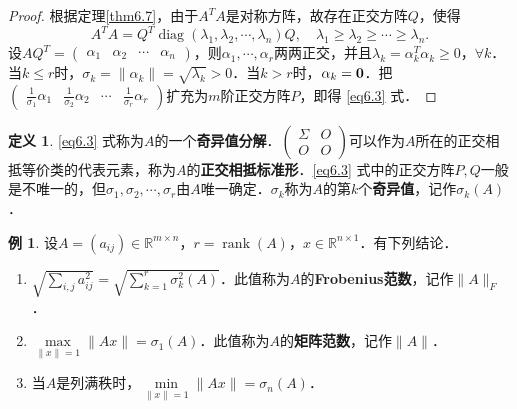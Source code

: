\documentclass[a4paper,fontset=windows]{ctexbook}
\theoremstyle{definition}
\newtheorem{definition}{定义}[chapter]
\newtheorem{example}{例}[chapter]
\DeclareMathOperator{\diag}{diag}
\DeclareMathOperator{\rank}{rank}
\renewcommand{\le}{\leqslant}
\renewcommand{\ge}{\geqslant}
\begin{document}
\begin{proof}
根据定理\ref{thm6.7}，由于$A^TA$是对称方阵，故存在正交方阵$Q$，使得
$$A^TA=Q^T\diag(\lambda_1,\lambda_2,\cdots,\lambda_n)Q,\quad\lambda_1\ge\lambda_2\ge\cdots\ge\lambda_n.$$
设$AQ^T=\begin{pmatrix}\alpha_1&\alpha_2&\cdots&\alpha_n\end{pmatrix}$，则$\alpha_1,\cdots,\alpha_r$两两正交，并且$\lambda_k=\alpha_k^T\alpha_k\ge 0$，$\forall k$．当$k\le r$时，$\sigma_k=\|\alpha_k\|=\sqrt{\lambda_k}>0$．当$k>r$时，$\alpha_k={\bf 0}$．把$\begin{pmatrix}\frac{1}{\sigma_1}\alpha_1&\frac{1}{\sigma_2}\alpha_2&\cdots&\frac{1}{\sigma_r}\alpha_r\end{pmatrix}$扩充为$m$阶正交方阵$P$，即得 \eqref{eq6.3} 式．
\end{proof}

\begin{definition}
\eqref{eq6.3} 式称为$A$的一个{\bf 奇异值分解}．$\begin{pmatrix}\Sigma&O \\ O&O\end{pmatrix}$可以作为$A$所在的正交相抵等价类的代表元素，称为$A$的{\bf 正交相抵标准形}．\eqref{eq6.3} 式中的正交方阵$P,Q$一般是不唯一的，但$\sigma_1,\sigma_2,\cdots,\sigma_r$由$A$唯一确定．$\sigma_k$称为$A$的第$k$个{\bf 奇异值}，记作$\sigma_k(A)$．
\end{definition}

\begin{example}
设$A=(a_{ij})\in\mathbb{R}^{m\times n}$，$r=\rank(A)$，$x\in\mathbb{R}^{n\times 1}$．有下列结论．
\begin{enumerate}
\item $\sqrt{\sum\limits_{i,j}a_{ij}^2}=\sqrt{\sum\limits_{k=1}^r\sigma_k^2(A)}$．此值称为$A$的{\bf Frobenius范数}，记作$\|A\|_F$．

\item $\max\limits_{\|x\|=1}\|Ax\|=\sigma_1(A)$．此值称为$A$的{\bf 矩阵范数}，记作$\|A\|$．

\item 当$A$是列满秩时，$\min\limits_{\|x\|=1}\|Ax\|=\sigma_n(A)$．
\end{enumerate}
\end{example}
\end{document}
